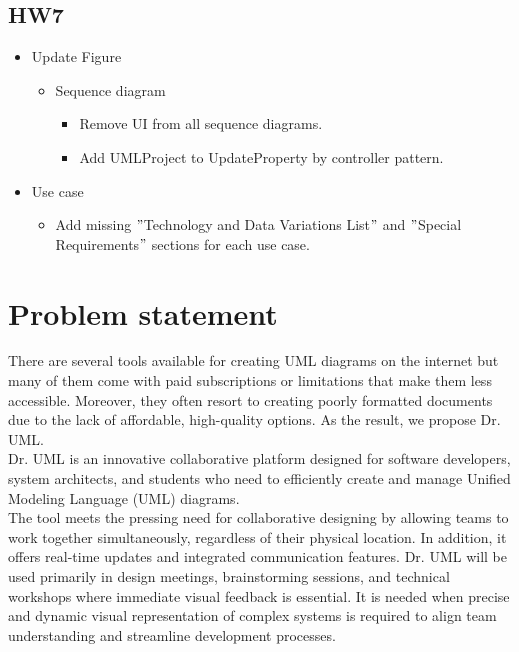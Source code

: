 \documentclass[12pt]{article}
\begin{document}
    \subsection{HW7}
    \begin{itemize}
        \item Update Figure
        \begin{itemize}
            \item Sequence diagram
            \begin{itemize}
                \item Remove UI from all sequence diagrams.
                \item Add UMLProject to UpdateProperty by controller pattern.
            \end{itemize}
        \end{itemize}
        \item Use case
        \begin{itemize}
            \item Add missing \("\)Technology and Data Variations List\("\) and \("\)Special Requirements\("\) sections for each use case.
        \end{itemize}
    \end{itemize}



    \section{Problem statement}


    There are several tools available for creating UML diagrams on the internet but many of them come with paid subscriptions or limitations that make them less accessible. Moreover, they often resort to creating poorly formatted documents due to the lack of affordable, high-quality options. As the result, we propose Dr. UML.\\

    Dr. UML is an innovative collaborative platform designed for software developers, system architects, and students who need to efficiently create and manage Unified Modeling Language (UML) diagrams.\\

    The tool meets the pressing need for collaborative designing by allowing teams to work together simultaneously, regardless of their physical location. In addition, it offers real-time updates and integrated communication features. Dr. UML will be used primarily in design meetings, brainstorming sessions, and technical workshops where immediate visual feedback is essential. It is needed when precise and dynamic visual representation of complex systems is required to align team understanding and streamline development processes.\\
\end{document}
